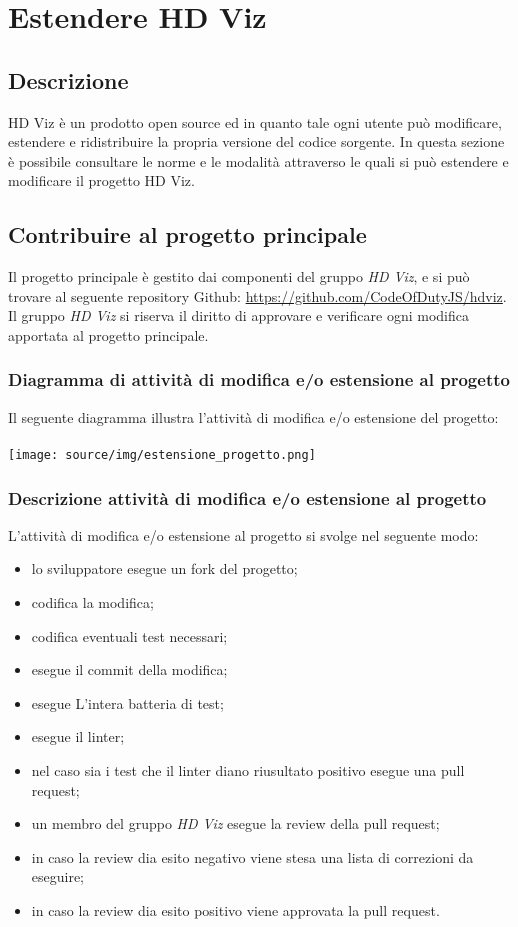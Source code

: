 \section{Estendere HD Viz}
    \subsection{Descrizione}
    HD Viz è un prodotto open source ed in quanto tale ogni utente può modificare, estendere e ridistribuire la propria versione del codice sorgente. In questa sezione è possibile consultare le norme e le modalità attraverso le quali si può estendere e modificare il progetto HD Viz.
    \subsection{Contribuire al progetto principale}
    Il progetto principale è gestito dai componenti del gruppo \textit{HD Viz}, e si può trovare al seguente repository Github: \href{https://github.com/CodeOfDutyJS/hdviz}{https://github.com/CodeOfDutyJS/hdviz}.
    Il gruppo \textit{HD Viz} si riserva il diritto di approvare e verificare ogni modifica apportata al progetto principale.
        \subsubsection{Diagramma di attività di modifica e/o estensione al progetto}
        Il seguente diagramma illustra l'attività di modifica e/o estensione del progetto:
        \\
        \\
        \texttt{[image: source/img/estensione\_progetto.png]}
        \subsubsection{Descrizione attività di modifica e/o estensione al progetto}
        L'attività di modifica e/o estensione al progetto si svolge nel seguente modo:
        \begin{itemize}
            \item lo sviluppatore esegue un fork del progetto;
            \item codifica la modifica;
            \item codifica eventuali test necessari;
            \item esegue il commit della modifica;
            \item esegue L'intera batteria di test;
            \item esegue il linter;
            \item nel caso sia i test che il linter diano riusultato positivo esegue una pull request;
            \item un membro del gruppo \textit{HD Viz} esegue la review della pull request;
            \item in caso la review dia esito negativo viene stesa una lista di correzioni da eseguire;
            \item in caso la review dia esito positivo viene approvata la pull request.
        \end{itemize}
